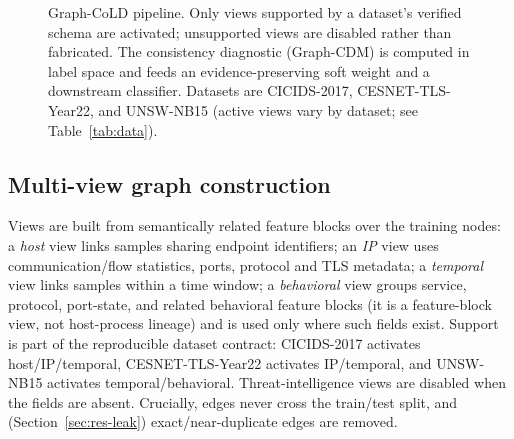 \documentclass[preprint,3p,times]{elsarticle}
\begin{document}
\begin{figure}[t]
\centering
{}
\caption{Graph-CoLD pipeline. Only views supported by a dataset's verified schema
are activated; unsupported views are disabled rather than fabricated. The
consistency diagnostic (Graph-CDM) is computed in label space and feeds an
evidence-preserving soft weight and a downstream classifier. Datasets are
CICIDS-2017, CESNET-TLS-Year22, and UNSW-NB15 (active views vary by dataset;
see Table~\ref{tab:data}).}
\label{fig:overview}
\end{figure}

\subsection{Multi-view graph construction}
Views are built from semantically related feature blocks over the training nodes:
a \emph{host} view links samples sharing endpoint identifiers; an \emph{IP} view
uses communication/flow statistics, ports, protocol and TLS metadata; a
\emph{temporal} view links samples within a time window; a \emph{behavioral} view
groups service, protocol, port-state, and related behavioral feature blocks
(it is a feature-block view, not host-process lineage) and is used only where such
fields exist. Support is part of the reproducible
dataset contract: CICIDS-2017 activates host/IP/temporal, CESNET-TLS-Year22
activates IP/temporal, and UNSW-NB15 activates temporal/behavioral. Threat-intelligence
views are disabled when the fields are absent. Crucially, edges never cross the
train/test split, and (Section~\ref{sec:res-leak}) exact/near-duplicate edges are
removed.
\end{document}
